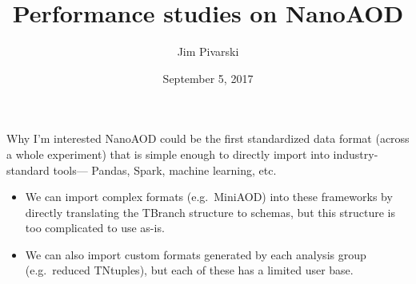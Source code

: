 \documentclass{beamer}
\title[2017-09-05-nanoaod-xpog]{Performance studies on NanoAOD}
\author{Jim Pivarski}
\institute{Princeton University -- DIANA}
\date{September 5, 2017}
\begin{document}

\begin{frame}
  \titlepage
\end{frame}




\begin{frame}{Why I'm interested}
\vspace{0.5 cm}
NanoAOD could be the first standardized data format (across a whole experiment) that is simple enough to directly import into industry-standard tools--- Pandas, Spark, machine learning, etc.

\vspace{0.3 cm}
\begin{itemize}\setlength{\itemsep}{0.5 cm}
\item<2-> We can import complex formats (e.g.\ MiniAOD) into these frameworks by directly translating the TBranch structure to schemas, but this structure is too complicated to use as-is.

\item<3-> We can also import custom formats generated by each analysis group (e.g.\ reduced TNtuples), but each of these has a limited user base.
\end{itemize}

\vspace{0.2 cm}
\end{frame}
\end{document}
